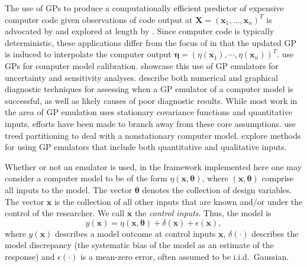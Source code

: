 \documentclass[12pt]{article}
\begin{document}
%
The use of GPs to produce a computationally efficient predictor of expensive computer code given observations of code output at $\mathbf X=(\mathbf x_1,\ldots,\mathbf x_n)^T$ is advocated by \cite{Sacks1989} and explored at length by \cite{Santner2003a}.
%
Since computer code is typically deterministic, these applications differ from the focus of \cite{OHagan1978} in that the updated GP is induced to interpolate the computer output $\boldsymbol \eta = (\eta(\mathbf x_1),\cdots,\eta(\mathbf x_n))^T$. 
%
\cite{Kennedy2001} use GPs for computer model calibration. 
%
\cite{Kennedy2006} showcase this use of GP emulators for uncertainty and sensitivity analyses. 
%
\cite{Bastos2009} describe both numerical and graphical diagnostic techniques for assessing when a GP emulator of a computer model is successful, as well as likely causes of poor diagnostic results. 
%
While most work in the area of GP emulation uses stationary covariance functions 
and quantitative inputs, efforts have been made to branch away from these core assumptions. 
%
\cite{Gramacy2008} use treed partitioning to deal with a nonstationary computer model. 
%
\cite{Qian2008} explore methods for using GP emulators that include both quantitative and qualitative inputs.
%

%
Whether or not an emulator is used, in the framework implemented here one may consider a computer model to be of the form $\eta(\mathbf x,\boldsymbol \theta)$, where $(\mathbf x,\boldsymbol \theta)$ comprise all inputs to the model. 
%
The vector $\boldsymbol \theta$ denotes the collection of design variables. 
%
The vector $\mathbf x$ is the collection of all other inputs that are known and/or under the control of the researcher.
%
We call $\mathbf x$ the \emph{control inputs}.
%
Thus, the model is
%
\begin{equation} \label{eq:model_gen}
y(\mathbf x)=\eta(\mathbf x,\boldsymbol \theta) + \delta(\mathbf x)+\epsilon(\mathbf x),
\end{equation} 
%
where $y(\mathbf x)$ describes a model outcome at control inputs $\mathbf x$, $\delta(\cdot)$ describes the model discrepancy (the systematic bias of the model as an estimate of the response) and $\epsilon(\cdot)$ is a mean-zero error, often assumed to be i.i.d.\ Gaussian. 
%
\end{document}
